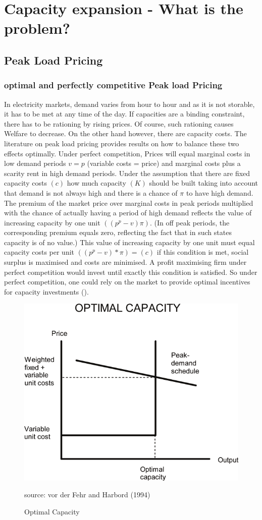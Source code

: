 \section{Capacity expansion - What is the problem?}

\subsection{Peak Load Pricing}

\subsubsection{optimal and perfectly competitive Peak load Pricing}

In electricity markets, demand varies from hour to hour and as it is not storable, it has to be met at any time of the day. If capacities are a binding constraint, there has to be rationing by rising prices. Of course, such rationing causes Welfare to decrease. On the other hand however, there are capacity costs. The literature on peak load pricing provides results on how to balance these two effects optimally. Under perfect competition, Prices will equal marginal costs in low demand periods $v=p$ (variable costs = price) and marginal costs plus a scarity rent in high demand periods. Under the assumption that there are fixed capacity costs $(c)$ how much capacity $(K)$ should be built taking into account that demand is not always high and there is a chance of $\pi$ to have high demand. The premium of the market price over marginal costs in peak periods multiplied with the chance of actually having a period of high demand reflects the value of increasing capacity by one unit $((p^p-v)\pi)$. (In off peak periods, the corresponding premium equals zero, reflecting the fact that in such states capacity is of no value.) This value of increasing capacity by one unit must equal capacity costs per unit $((p^p-v)*\pi)=(c)$ if this condition is met, social surplus is maximised and costs are minimised. A profit maximising firm under perfect competition would invest until exactly this condition is satisfied. So under perfect competition, one could rely on the market to provide optimal incentives for capacity investments (\cite{Fehr1994}).

\begin{figure}[h]
\centering
\includegraphics[width=.5\textwidth]{capacity/peak_load_opt}
      \label{peak_load_opt}
      \caption{Optimal Capacity}
      source: vor der Fehr and Harbord (1994)     
\end{figure}

